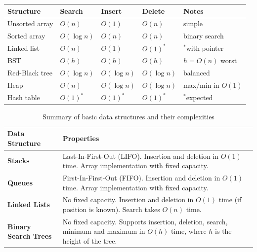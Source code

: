 \documentclass[11pt,a4paper,openany]{book}
\begin{document}
\begin{center}
\begin{tabular}{lllll}
\toprule
Structure    & Search    & Insert      & Delete      & Notes \\
\midrule
Unsorted array & $O(n)$  & $O(1)$      & $O(n)$      & simple \\
Sorted array   & $O(\log n)$ & $O(n)$  & $O(n)$      & binary search \\
Linked list    & $O(n)$  & $O(1)$      & $O(1)^*$    & $^*$with pointer \\
BST            & $O(h)$  & $O(h)$      & $O(h)$      & $h = O(n)$ worst \\
Red-Black tree & $O(\log n)$ & $O(\log n)$ & $O(\log n)$ & balanced \\
Heap           & $O(n)$  & $O(\log n)$ & $O(\log n)$ & max/min in $O(1)$ \\
Hash table     & $O(1)^*$& $O(1)^*$    & $O(1)^*$    & $^*$expected \\
\bottomrule
\end{tabular}
\end{center}




\begin{table}[h]
\centering

\begin{tabular}{|p{3.5cm}|p{10cm}|}
\hline
\textbf{Data Structure} & \textbf{Properties} \\
\hline

\textbf{Stacks} &
Last-In-First-Out (LIFO). \newline
Insertion and deletion in $O(1)$ time. \newline
Array implementation with fixed capacity. \\
\hline

\textbf{Queues} &
First-In-First-Out (FIFO). \newline
Insertion and deletion in $O(1)$ time. \newline
Array implementation with fixed capacity. \\
\hline

\textbf{Linked Lists} &
No fixed capacity. \newline
Insertion and deletion in $O(1)$ time (if position is known). \newline
Search takes $O(n)$ time. \\
\hline

\textbf{Binary Search Trees} &
No fixed capacity. \newline
Supports insertion, deletion, search, minimum and maximum in $O(h)$ time, where $h$ is the height of the tree. \\
\hline

\end{tabular}

\caption{Summary of basic data structures and their complexities}
\end{table}
\end{document}
